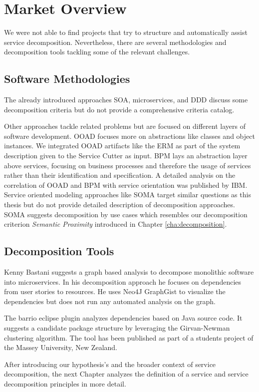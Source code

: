 \section{Market Overview}

We were not able to find projects that try to structure and automatically assist service decomposition. Nevertheless, there are several methodologies and decomposition tools tackling some of the relevant challenges. 

\subsection{Software Methodologies}

The already introduced approaches \gls{SOA}, microservices, and \gls{DDD} discuss some decomposition criteria but do not provide a comprehensive criteria catalog. 

Other approaches tackle related problems but are focused on different layers of software development. \gls{OOAD} focuses more on abstractions like classes and object instances. We integrated \gls{OOAD} artifacts like the \gls{ERM} as part of the system description given to the Service Cutter as input. \gls{BPM} lays an abstraction layer above services, focusing on business processes and therefore the usage of services rather than their identification and specification. A detailed analysis on the correlation of \gls{OOAD} and \gls{BPM} with service orientation was published by IBM\cite{zimmermann2004elements}. Service oriented modeling approaches like \gls{SOMA}\cite{arsanjani2004service} target similar questions as this thesis but do not provide detailed description of decomposition approaches. \gls{SOMA} suggests decomposition by use cases which resembles our decomposition criterion \textit{Semantic Proximity} introduced in Chapter \ref{cha:decomposition}.

\subsection{Decomposition Tools}

Kenny Bastani suggests a graph based analysis to decompose monolithic software into microservices\cite{bastani}. In his decomposition approach he focuses on dependencies from user stories to resources. He uses Neo4J GraphGist\cite{graphGist} to visualize the dependencies but does not run any automated analysis on the graph. 

The barrio eclipse plugin\cite{dietrich2008cluster} analyzes dependencies based on Java source code. It suggests a candidate package structure by leveraging the Girvan-Newman clustering algorithm. The tool has been published as part of a students project of the Massey University, New Zealand.

\bigskip

After introducing our hypothesis's and the broader context of service decomposition, the next Chapter analyzes the definition of a service and service decomposition principles in more detail. 

